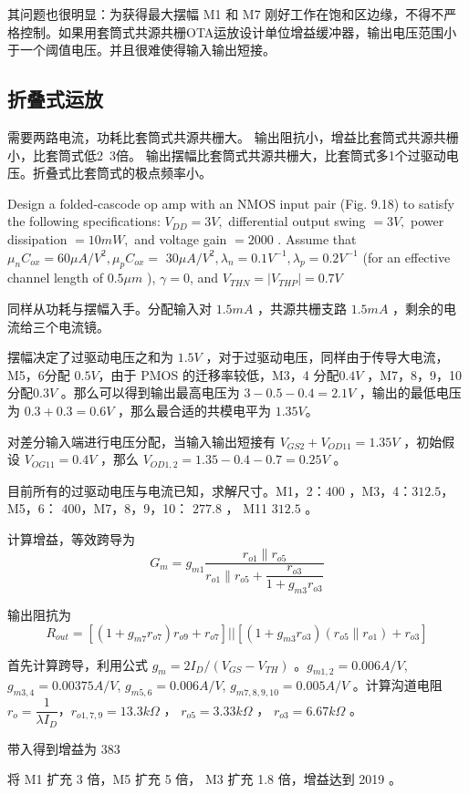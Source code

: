 \documentclass[cn,11pt,chinese,black,simple]{../elegantbook}
\begin{document}
其问题也很明显：为获得最大摆幅 M1 和 M7 刚好工作在饱和区边缘，不得不严格控制。如果用套筒式共源共栅OTA运放设计单位增益缓冲器，输出电压范围小于一个阈值电压。并且很难使得输入输出短接。


\subsection{折叠式运放}

需要两路电流，功耗比套筒式共源共栅大。
输出阻抗小，增益比套筒式共源共栅小，比套筒式低2~3倍。
输出摆幅比套筒式共源共栅大，比套筒式多1个过驱动电压。折叠式比套筒式的极点频率小。

\begin{example}
    Design a folded-cascode op amp with an NMOS input pair (Fig. 9.18) to satisfy the following specifications:
\(V_{D D}=3 V ,\) differential output swing \(=3 V ,\) power dissipation \(=10 mW ,\) and voltage gain \(=2000 \) . Assume that \(\mu_{n} C_{o x}=60 \mu A / V ^{2}, \mu_{p} C_{o x}=\) \(30 \mu A / V ^{2}, \lambda_{n}=0.1 V ^{-1}, \lambda_{p}=0.2 V ^{-1}\) (for an effective channel length of \(0.5 \mu m\) ), \(\gamma=0\), and \(V_{T H N}=\left|V_{T H P}\right|= 0.7 V\)
\end{example}

\begin{solution}
    同样从功耗与摆幅入手。分配输入对 \(1.5 mA\) ，共源共栅支路 \(1.5 mA\) ，剩余的电流给三个电流镜。
    
    摆幅决定了过驱动电压之和为 \(1.5 V\) ，对于过驱动电压，同样由于传导大电流，M5，6分配 \(0.5 V\)，由于 PMOS 的迁移率较低，M3，4 分配\(0.4 V\) ，M7，8，9，10 分配\(0.3 V\) 。那么可以得到输出最高电压为 \(3 - 0.5 - 0.4 = 2.1 V\) ，输出的最低电压为 \(0.3 + 0.3 = 0.6 V\) ，那么最合适的共模电平为 \(1.35 V\)。

    对差分输入端进行电压分配，当输入输出短接有 \(V_{GS2} + V_{OD11} = 1.35 V\) ，初始假设 \(V_{OG11} = 0.4 V\) ，那么 \(V_{OD1,2} = 1.35 - 0.4 - 0.7 = 0.25 V\) 。

    目前所有的过驱动电压与电流已知，求解尺寸。M1，2：\(400\) ，M3，4：\(312.5\)，M5，6： \(400\)，M7，8，9，10： \(277.8\) ， M11 \(312.5\) 。

    计算增益，等效跨导为 \[ G_m = g_{m1} \dfrac{r_{o1} \| r_{o5}}{r_{o1} \| r_{o5} + \dfrac{r_{o3}}{1+g_{m3} r_{o3}}}\]

    输出阻抗为 \[R_{out} = [(1 + g_{m7} r_{o7})r_{o9} + r_{o7}] \left|\right| [(1 + g_{m3} r_{o3})(r_{o5} \| r_{o1}) + r_{o3}]\]
    
    首先计算跨导，利用公式 \(g_m = 2 I_D / (V_{GS} - V_{TH})\) 。\(g_{m1,2} = 0.006 A/V\), \(g_{m3,4} = 0.00375 A/V\), \(g_{m5,6} = 0.006 A/V\), \(g_{m7,8,9,10} = 0.005 A/V\) 。计算沟道电阻 \(r_o = \dfrac{1}{\lambda I_D}\)，\(r_{o1,7,9} = 13.3 k\Omega\) ， \(r_{o5} = 3.33 k\Omega\) ， \(r_{o3} = 6.67 k\Omega\) 。
    
    带入得到增益为 \(383\) 

    将 M1 扩充 3 倍，M5 扩充 5 倍， M3 扩充 1.8 倍，增益达到 2019 。


\end{solution}
\end{document}

